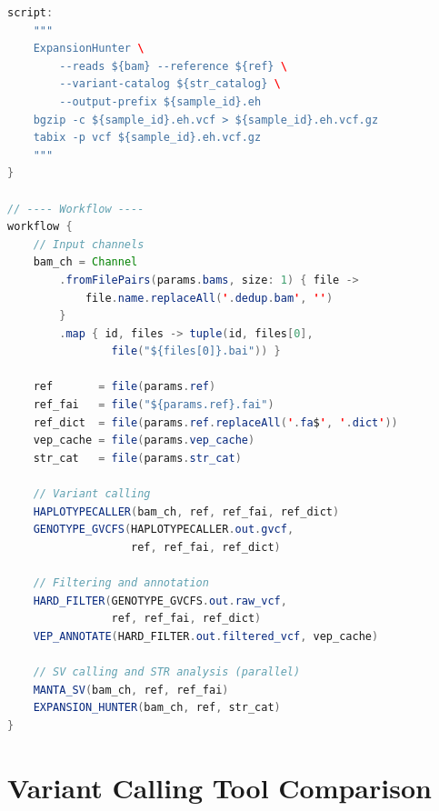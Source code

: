 \begin{lstlisting}[language=Java, caption={Nextflow DSL2 pipeline for variant calling, filtering, and annotation.}, label={lst:nextflow_variants}]
    script:
    """
    ExpansionHunter \
        --reads ${bam} --reference ${ref} \
        --variant-catalog ${str_catalog} \
        --output-prefix ${sample_id}.eh
    bgzip -c ${sample_id}.eh.vcf > ${sample_id}.eh.vcf.gz
    tabix -p vcf ${sample_id}.eh.vcf.gz
    """
}

// ---- Workflow ----
workflow {
    // Input channels
    bam_ch = Channel
        .fromFilePairs(params.bams, size: 1) { file ->
            file.name.replaceAll('.dedup.bam', '')
        }
        .map { id, files -> tuple(id, files[0],
                file("${files[0]}.bai")) }

    ref       = file(params.ref)
    ref_fai   = file("${params.ref}.fai")
    ref_dict  = file(params.ref.replaceAll('.fa$', '.dict'))
    vep_cache = file(params.vep_cache)
    str_cat   = file(params.str_cat)

    // Variant calling
    HAPLOTYPECALLER(bam_ch, ref, ref_fai, ref_dict)
    GENOTYPE_GVCFS(HAPLOTYPECALLER.out.gvcf,
                   ref, ref_fai, ref_dict)

    // Filtering and annotation
    HARD_FILTER(GENOTYPE_GVCFS.out.raw_vcf,
                ref, ref_fai, ref_dict)
    VEP_ANNOTATE(HARD_FILTER.out.filtered_vcf, vep_cache)

    // SV calling and STR analysis (parallel)
    MANTA_SV(bam_ch, ref, ref_fai)
    EXPANSION_HUNTER(bam_ch, ref, str_cat)
}
\end{lstlisting}

\section{Variant Calling Tool Comparison}
\label{sec:tool_comparison}

